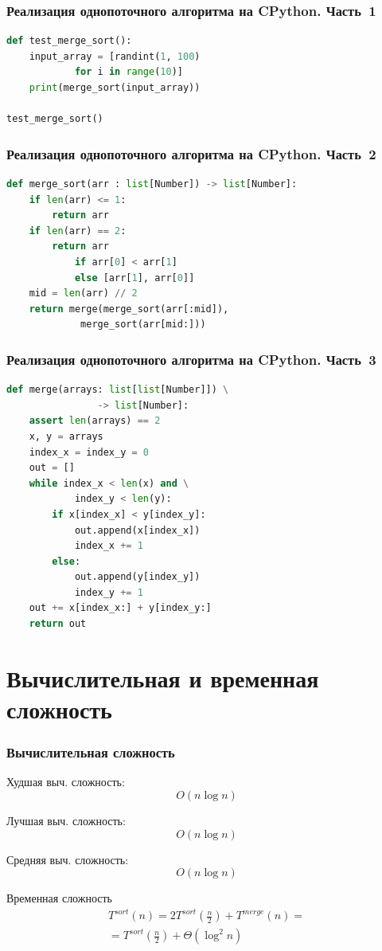 \documentclass{beamer}
\begin{document}
	\begin{frame}[fragile]
		\frametitle{Реализация однопоточного алгоритма на CPython. Часть~1}
		\begin{lstlisting}[language=Python]		
def test_merge_sort():
	input_array = [randint(1, 100) 
			for i in range(10)]
	print(merge_sort(input_array))

test_merge_sort()
		\end{lstlisting}
	
	\end{frame}

	\begin{frame}[fragile]
		\frametitle{Реализация однопоточного алгоритма на CPython. Часть~2}
		\begin{lstlisting}[language=Python]		
def merge_sort(arr : list[Number]) -> list[Number]:
	if len(arr) <= 1:
		return arr
	if len(arr) == 2:
		return arr 
			if arr[0] < arr[1] 
			else [arr[1], arr[0]]
	mid = len(arr) // 2
	return merge(merge_sort(arr[:mid]), 
		     merge_sort(arr[mid:]))
		\end{lstlisting}
	
	\end{frame}

	\begin{frame}[fragile]
		\frametitle{Реализация однопоточного алгоритма на CPython. Часть~3}
		\begin{lstlisting}[language=Python]		
def merge(arrays: list[list[Number]]) \
				-> list[Number]:
	assert len(arrays) == 2
	x, y = arrays
	index_x = index_y = 0
	out = []
	while index_x < len(x) and \
			index_y < len(y):
		if x[index_x] < y[index_y]:
			out.append(x[index_x])
			index_x += 1
		else:
			out.append(y[index_y])
			index_y += 1
	out += x[index_x:] + y[index_y:]
	return out
		\end{lstlisting}
	
	\end{frame}


	\section{Вычислительная и временная сложность}
	\begin{frame}
		\frametitle{Вычислительная сложность}
		
		Худшая выч. сложность:
		\begin{equation}
			O(n\log{}{n})
		\end{equation}
		
		Лучшая выч. сложность:
		\begin{equation}
			O(n\log{}{n})
		\end{equation}
		
		Средняя выч. сложность:
		\begin{equation}
			O(n\log{}{n})
		\end{equation}
	
		Временная сложность
		\begin{multline}
			T^{sort}(n)=2T^{sort}\left(\frac{n}{2}\right)+T^{merge}(n)=\\=T^{sort}\left(\frac{n}{2}\right)+\Theta(\log^2{}{n})
		\end{multline}
	\end{frame}
	
\end{document}
